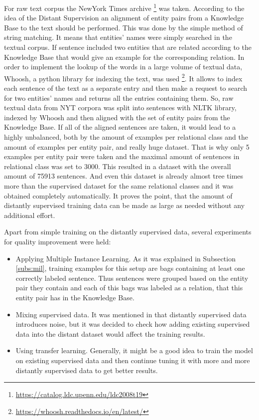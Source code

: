 For raw text corpus the NewYork 
Times archive \footnote{\url{https://catalog.ldc.upenn.edu/ldc2008t19}} was taken.
According to the idea of the 
Distant Supervision an alignment of entity pairs from a Knowledge Base to the text should be performed. This was done by the 
simple method of string matching. It means that entities' names were simply searched 
in the textual corpus. If sentence included two entities that are related according to the Knowledge Base that would give an example
for the corresponding relation.
In order to implement the lookup of the words in a large volume of textual data, Whoosh, a python library for 
indexing the text, was used \footnote{\url{https://whoosh.readthedocs.io/en/latest/}}. It allows to index 
each sentence of the text as a separate entry and then make a request to search for two 
entities' names and returns all the entries containing them. So, raw textual data 
from NYT corpora was split into sentences with NLTK library, indexed by 
Whoosh and then aligned with the set of entity pairs from the Knowledge Base. If all 
of the aligned sentences are taken, it would lead to a highly unbalanced, both by the amount of 
examples per relational class and the amount of examples per entity pair, and really huge dataset. That is why 
only 5 examples per entity pair were taken and the maximal amount of sentences in relational class 
was set to 3000. This resulted in a dataset with the overall amount of 75913 sentences. And even this dataset is 
already almost tree times more than the supervised dataset for the same relational classes and it was obtained 
completely automatically. It proves the point, that the amount of distantly supervised training data can be 
made as large as needed without any additional effort.

Apart from simple training on the distantly supervised data, several experiments for quality 
improvement were held: 
\begin{itemize}
  \item Applying Multiple Instance Learning. As it was explained in Subsection \ref{subs:mil}, training 
  examples for this setup are bags containing at least one correctly labeled sentence. Thus sentences 
  were grouped based on the entity pair they contain and each of this bags was labeled as 
  a relation, that this entity pair has in the Knowledge Base.
  \item Mixing supervised data. It was mentioned in \cite{riedel2010modeling} that distantly 
  supervised data introduces noise, but it was decided to check how adding existing 
  supervised data into the distant dataset would affect the training results.
  \item Using transfer learning. Generally, it might be a good idea to train the model on 
  existing supervised data and then continue tuning it with more and more distantly supervised data to get better results.
\end{itemize}

